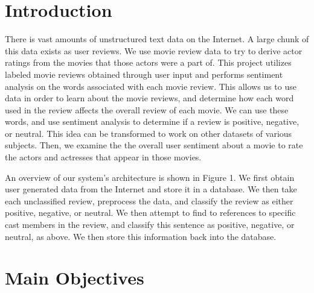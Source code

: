 \documentclass[a0,portrait]{a0poster}
\begin{document}
\begin{multicols}{2} %

\color{DarkSlateGray} %

\section*{Introduction}

There is vast amounts of unstructured text data on the Internet.  A large chunk of this data exists as user reviews. We use movie review data to try to derive actor ratings from the movies that those actors were a part of.  This project utilizes labeled movie reviews obtained through user input and performs sentiment analysis on the words associated with each movie review.  This allows us to use data in order to learn about the movie reviews, and determine how each word used in the review affects the overall review of each movie.  We can use these words, and use sentiment analysis to determine if a review is positive, negative, or neutral.  This idea can be transformed to work on other datasets of various subjects.  Then, we examine the the overall user sentiment about a movie to rate the actors and actresses that appear in those movies. 

An overview of our system's architecture is shown in Figure 1. We first obtain user generated data from the Internet and store it in a database. We then take each unclassified review, preprocess the data, and classify the review as either positive, negative, or neutral. We then attempt to find to references to specific cast members in the review, and classify this sentence as positive, negative, or neutral, as above. We then store this information back into the database. 

\section*{Main Objectives}


\end{multicols}
\end{document}
